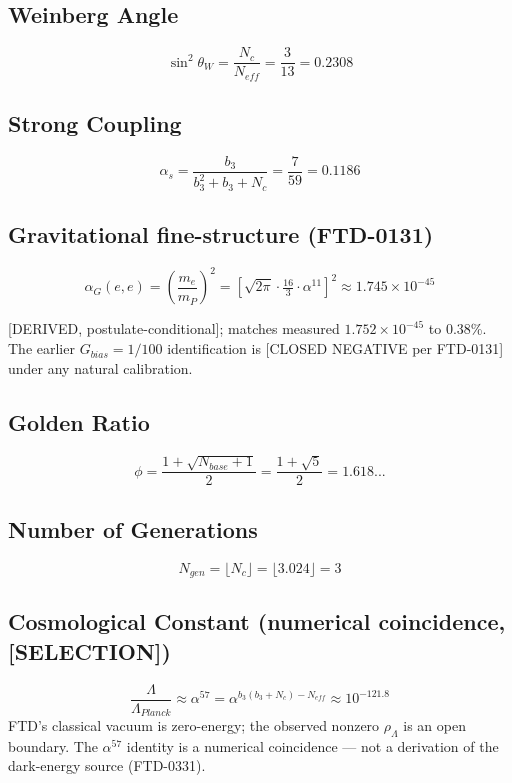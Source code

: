 \documentclass[
  11pt,
  letterpaper,
  twoside,
  openright]{book}
\begin{document}
\subsection{Weinberg Angle}\label{weinberg-angle}

\[
\sin^2\theta_W = \frac{N_c}{N_{eff}} = \frac{3}{13} = 0.2308
\]

\subsection{Strong Coupling}\label{strong-coupling}

\[
\alpha_s = \frac{b_3}{b_3^2 + b_3 + N_c} = \frac{7}{59} = 0.1186
\]

\subsection{Gravitational fine-structure
(FTD-0131)}\label{gravitational-fine-structure-ftd-0131-1}

\[
\alpha_G(e,e) = \left(\frac{m_e}{m_P}\right)^2 = \left[\sqrt{2\pi}\cdot\tfrac{16}{3}\cdot\alpha^{11}\right]^2 \approx 1.745 \times 10^{-45}
\]

{[}DERIVED, postulate-conditional{]}; matches measured
\(1.752 \times 10^{-45}\) to 0.38\%. The earlier \(G_{bias} = 1/100\)
identification is {[}CLOSED NEGATIVE per FTD-0131{]} under any natural
calibration.

\subsection{Golden Ratio}\label{golden-ratio}

\[
\phi = \frac{1 + \sqrt{N_{base}+1}}{2} = \frac{1+\sqrt{5}}{2} = 1.618...
\]

\subsection{Number of Generations}\label{number-of-generations-1}

\[
N_{gen} = \lfloor N_c \rfloor = \lfloor 3.024 \rfloor = 3
\]

\subsection{Cosmological Constant (numerical coincidence,
{[}SELECTION{]})}\label{cosmological-constant-numerical-coincidence-selection}

\[
\frac{\Lambda}{\Lambda_{Planck}} \approx \alpha^{57} = \alpha^{b_3(b_3+N_c) - N_{eff}} \approx 10^{-121.8}
\] FTD's classical vacuum is zero-energy; the observed nonzero
\(\rho_\Lambda\) is an open boundary. The \(\alpha^{57}\) identity is a
numerical coincidence --- not a derivation of the dark-energy source
(FTD-0331).
\end{document}
